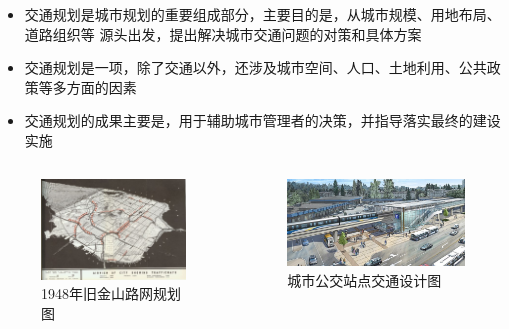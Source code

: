 \documentclass{beamerthemeMono}
\begin{document}
\begin{frame}[t]{\subsecname}
\begin{itemize}
\item 交通规划是城市规划的重要组成部分，主要目的是，从城市规模、用地布局、道路组织等
源头出发，提出解决城市交通问题的对策和具体方案
\item 交通规划是一项，除了交通以外，还涉及城市空间、人口、土地利用、公共政策等多方面的因素
\item 交通规划的成果主要是，用于辅助城市管理者的决策，并指导落实最终的建设实施
\end{itemize}

\begin{columns}
  \begin{column}{.4\textwidth}
    \begin{figure}\flushright
      \includegraphics[height=0.3\textheight]{chp01_旧金山.jpg}
      \caption{1948年旧金山路网规划图}
    \end{figure}
  \end{column}
  \begin{column}{.6\textwidth}
    \begin{figure}\flushleft
      \includegraphics[height=0.3\textheight]{chp01_交通设计.jpg}
      \caption{城市公交站点交通设计图}
    \end{figure}
  \end{column}
\end{columns}
\end{frame}
\end{document}
